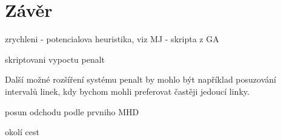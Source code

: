 \chapter*{Závěr}

zrychleni - potencialova heuristika, viz MJ - skripta z GA

skriptovani vypoctu penalt

Další možné rozšíření systému penalt by mohlo být například posuzování intervalů
linek, kdy bychom mohli preferovat častěji jedoucí linky. 

posun odchodu podle prvniho MHD

okolí cest
